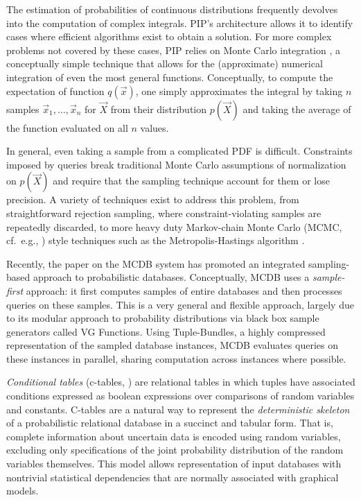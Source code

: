 

The estimation of probabilities of continuous distributions frequently devolves into the computation of complex integrals.  PIP's architecture allows it to identify cases where efficient algorithms exist to obtain a solution.  For more complex problems not covered by these cases, PIP relies on Monte Carlo integration \cite{montecarlo}, a conceptually simple technique that allows for the (approximate) numerical integration of even the most general  functions. Conceptually, to compute the expectation of function $q(\vec x)$, one simply approximates the integral by taking $n$ samples $\vec{x}_1, \dots, \vec{x}_n$ for $\vec{X}$ from their distribution $p(\vec X)$  and  taking  the  average of the function evaluated on all $n$ values.
%

In general, even taking a sample from a complicated PDF is difficult.  Constraints imposed by queries break traditional Monte Carlo assumptions of normalization on $p(\vec X)$ and require that the sampling technique account for them or lose precision.  A variety of techniques exist to address this problem, from straightforward rejection sampling, where constraint-violating samples are repeatedly discarded, to more heavy duty Markov-chain Monte Carlo (MCMC, cf.\ e.g., \cite{GRS1995}) style techniques such as the Metropolis-Hastings algorithm \cite{metropolis,GRS1995}. 

Recently,  the paper  \cite{MCDB} on  the MCDB  system  has promoted an integrated  sampling-based  approach to  probabilistic databases.  Conceptually,  MCDB uses a {\em sample-first}\/ approach: it   first  computes  samples  of  entire databases and then processes queries  on these samples.  This is a very general and flexible approach, largely due to its modular approach to probability distributions via black box sample generators called VG Functions.  Using Tuple-Bundles, a highly compressed representation of the sampled database instances, MCDB evaluates queries on these instances in parallel, sharing computation across instances where possible.  

{\em  Conditional tables}\/  (c-tables, \cite{IL1984})  are relational tables in which tuples have associated conditions expressed as boolean expressions over  comparisons of random variables  and constants. C-tables are a natural way to  represent  the  {\em  deterministic skeleton}\/  of a probabilistic relational  database in  a succinct  and tabular  form.  That  is, complete information  about uncertain data is encoded using random  variables, excluding only  specifications  of the  joint  probability  distribution of  the random  variables   themselves.   This  model   allows  representation of  input databases  with  nontrivial statistical  dependencies that are normally associated with graphical models. 

